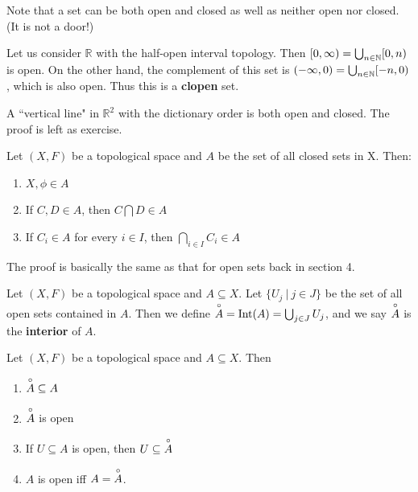 Note that a set can be both open and closed as well as neither open nor closed. (It is not a door!)
\begin{example}
	Let us consider $\mathbb{R}$ with the half-open interval topology. Then $[ 0,\infty) =\bigcup _{n \in \mathbb N} [0,n)$ is open. On the other hand, the complement of this set is $(-\infty,0) =\bigcup_{n \in\mathbb N } [-n,0)$, which is also open. Thus this is a {\bf clopen} set. 
\end{example}
\begin{example}
	A ``vertical line" in $\mathbb{R}^{2}$ with the dictionary order is both open and closed. The proof is left as exercise. 
\end{example}
\begin{lemma}
	Let $(X,F)$ be a topological space and $A$ be the set of all closed sets in X. Then: 
	\begin{enumerate}
		\item $X,\phi \in A$ 
		\item If $C,D \in A$, then $C \bigcap D \in A$ 
		\item If $C_i \in A$ for every $i \in I$, then $\bigcap_{i\in I}C_i \in A$ 
	\end{enumerate}
\end{lemma}
The proof is basically the same as that for open sets back in section 4.
\begin{definition}
	Let $(X,F)$ be a topological space and $A \subseteq X$. Let $\{ U_j\ |\ j \in J \}$ be the set of all open sets contained in $A$. Then we define $\overset{\circ}{A} = \mathrm{Int}(A) = \bigcup_{j \in J} U_j$, and we say $\overset{\circ}{A}$ is the {\bf interior} of $A$. 
\end{definition}
\begin{smallfact}
	Let $(X,F)$ be a topological space and $A \subseteq X$. Then 
	\begin{enumerate}
		\item $\overset{\circ}{A} \subseteq A$ 
		\item $\overset{\circ}{A}$ is open 
		\item If $U\subseteq A$ is open, then $U\subseteq \overset{\circ}{A}$ 
		\item $A$ is open iff $A = \overset{\circ}{A}$. 
	\end{enumerate}
\end{smallfact}
